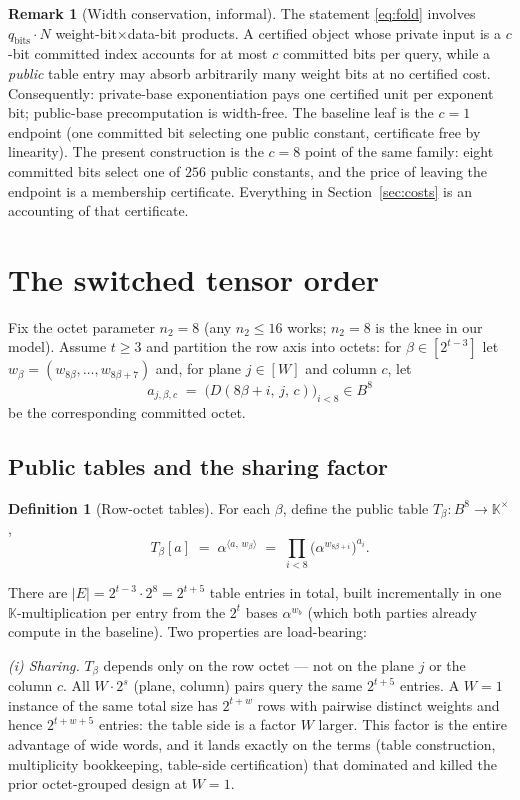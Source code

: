 \documentclass[11pt]{article}
\theoremstyle{definition}
\newtheorem{definition}[theorem]{Definition}
\newtheorem{remark}[theorem]{Remark}
\newcommand{\K}{\mathbb{K}}
\newcommand{\ip}[2]{\langle #1,\, #2\rangle}
\begin{document}
\begin{remark}[Width conservation, informal]\label{rem:conservation}
The statement \eqref{eq:fold} involves $q_{\mathrm{bits}}\cdot N$
weight-bit$\times$data-bit products. A certified object whose private
input is a $c$-bit committed index accounts for at most $c$ committed
bits per query, while a \emph{public} table entry may absorb arbitrarily
many weight bits at no certified cost. Consequently: private-base
exponentiation pays one certified unit per exponent bit; public-base
precomputation is width-free. The baseline leaf is the $c=1$ endpoint
(one committed bit selecting one public constant, certificate free by
linearity). The present construction is the $c=8$ point of the same
family: eight committed bits select one of $256$ public constants, and
the price of leaving the endpoint is a membership certificate. Everything
in Section~\ref{sec:costs} is an accounting of that certificate.
\end{remark}

\section{The switched tensor order}\label{sec:construction}

Fix the octet parameter $n_2=8$ (any $n_2\le 16$ works; $n_2=8$ is the
knee in our model). Assume $t\ge 3$ and partition the row axis into
octets: for $\beta\in[2^{t-3}]$ let
$w_\beta=(w_{8\beta},\dots,w_{8\beta+7})$ and, for plane $j\in[W]$ and
column $c$, let
\[
a_{j,\beta,c} \;=\;
\bigl(D(8\beta+i,\, j,\, c)\bigr)_{i<8} \in B^8
\]
be the corresponding committed octet.

\subsection{Public tables and the sharing factor}

\begin{definition}[Row-octet tables]\label{def:tables}
For each $\beta$, define the public table
$T_\beta : B^8 \to \K^\times$,
\[
T_\beta[a] \;=\; \alpha^{\ip{a}{w_\beta}}
\;=\; \prod_{i<8}\bigl(\alpha^{w_{8\beta+i}}\bigr)^{a_i}.
\]
\end{definition}
There are $|E|=2^{t-3}\cdot 2^8 = 2^{t+5}$ table entries in total, built
incrementally in one $\K$-multiplication per entry from the $2^t$ bases
$\alpha^{w_b}$ (which both parties already compute in the baseline). Two
properties are load-bearing:

\emph{(i) Sharing.} $T_\beta$ depends only on the row octet --- not on
the plane $j$ or the column $c$. All $W\cdot 2^s$ (plane, column) pairs
query the same $2^{t+5}$ entries. A $W=1$ instance of the same total size
has $2^{t+w}$ rows with pairwise distinct weights and hence $2^{t+w+5}$
entries: the table side is a factor $W$ larger. This factor is the entire
advantage of wide words, and it lands exactly on the terms (table
construction, multiplicity bookkeeping, table-side certification) that
dominated and killed the prior octet-grouped design at $W=1$.
\end{document}
